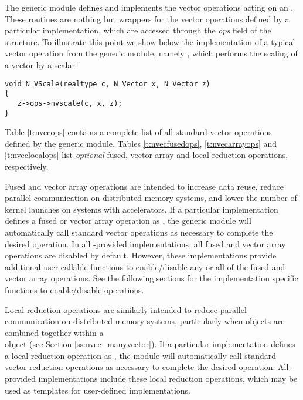The generic {\nvector} module defines and implements the vector operations
acting on an .
These routines are nothing but wrappers for the vector operations defined by
a particular {\nvector} implementation, which are accessed through the {\em ops}
field of the  structure. To illustrate this point we
show below the implementation of a typical vector operation from the
generic {\nvector} module, namely , which performs the scaling of a
vector  by a scalar :
\begin{verbatim}
void N_VScale(realtype c, N_Vector x, N_Vector z)
{
   z->ops->nvscale(c, x, z);
}
\end{verbatim}
Table \ref{t:nvecops} contains a complete list of all standard vector
operations defined by the generic {\nvector} module. Tables
\ref{t:nvecfusedops}, \ref{t:nvecarrayops} and \ref{t:nveclocalops}
list \textit{optional} fused, vector array and local reduction
operations, respectively.

Fused and vector array operations are intended to increase data reuse, reduce
parallel communication on distributed memory systems, and lower the number of
kernel launches on systems with accelerators. If a particular {\nvector}
implementation defines a fused or vector array operation as , the
generic {\nvector} module will automatically call standard vector operations as
necessary to complete the desired operation.  In all
{\sundials}-provided {\nvector} implementations, all fused and vector
array operations are disabled by default.  However, these
implementations provide additional user-callable functions to enable/disable
any or all of the fused and vector array operations. See the following sections
for the implementation specific functions to enable/disable operations.

Local reduction operations are similarly intended to reduce parallel
communication on distributed memory systems, particularly when
{\nvector} objects are combined together within a \\
{\nvecmanyvector} object (see Section \ref{ss:nvec_manyvector}).  If a
particular {\nvector} implementation defines a local reduction
operation as , the {\nvecmanyvector} module will
automatically call standard vector reduction operations as necessary
to complete the desired operation. All {\sundials}-provided {\nvector}
implementations include these local reduction operations, which may be
used as templates for user-defined {\nvector} implementations.

